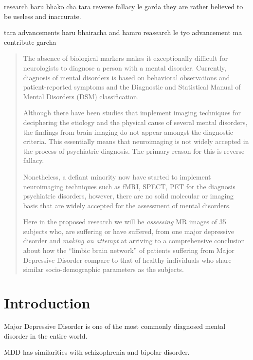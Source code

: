\documentclass{article}
\begin{document}
    research haru bhako cha tara reverse fallacy le garda they are
    rather believed to be useless and inaccurate.

    tara advancements haru bhairacha and hamro reasearch le tyo
    advancement ma contribute garcha

  \fi

\begin{abstract}

  The absence of biological markers makes it exceptionally difficult
  for neurologists to diagnose a person with a mental disorder.
  Currently, diagnosis of mental disorders is based on behavioral
  observations and patient-reported symptoms and the Diagnostic and
  Statistical Manual of Mental Disorders (DSM) classification.

  Although there have been studies that implement imaging techniques
  for deciphering the etiology and the physical cause of several
  mental disorders, the findings from brain imaging do not appear
  amongst the diagnostic criteria. This essentially means that
  neuroimaging is not widely accepted in the process of psychiatric
  diagnosis. The primary reason for this is reverse fallacy.

  Nonetheless, a defiant minority now have started to implement
  neuroimaging techniques such as fMRI, SPECT, PET for the diagnosis
  psychiatric disorders, however, there are no solid molecular or
  imaging basis that are widely accepted for the assessment of mental
  disorders.


  Here in the proposed research we will be \textit{assessing} MR
  images of 35 subjects who, are suffering or have suffered, from one
  major depressive disorder and \textit{making an attempt} at arriving
  to a comprehensive conclusion about how the ``limbic brain network''
  of patients suffering from Major Depressive Disorder compare to that
  of healthy individuals who share similar socio-demographic
  parameters as the subjects.

\end{abstract}

\newpage
\section{Introduction}

Major Depressive Disorder is one of the most commonly diagnosed mental
disorder in the entire world.

MDD has similarities with schizophrenia and bipolar disorder.
\end{document}
